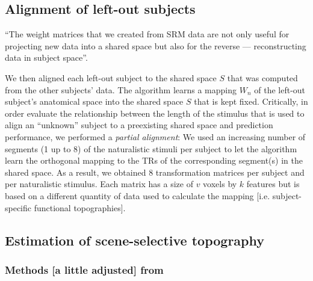 \subsection{Alignment of left-out subjects}


%
%

``The weight matrices that we created from SRM data are not only useful for
projecting new data into a shared space but also for the reverse —
reconstructing data in subject space''.

%
We then aligned each left-out subject to the shared space $S$ that was computed
from the other subjects' data.
%
The algorithm learns a mapping $W_{n}$ of the left-out subject's anatomical
space into the shared space $S$ that is kept fixed.
%
Critically, in order evaluate the relationship between the length of the
stimulus that is used to align an ``unknown'' subject to a preexisting shared
space and prediction performance, we performed a \textit{partial alignment}:
%
We used an increasing number of segments (1 up to 8) of the naturalistic stimuli
per subject to let the algorithm learn the orthogonal mapping to the TRs of the
corresponding segment(s) in the shared space.
%
As a result, we obtained 8 transformation matrices per subject and per
naturalistic stimulus.
%
Each matrix has a size of $v$ voxels by $k$ features but is based on a different
quantity of data used to calculate the mapping [i.e. subject-specific functional
topographies].


\subsection{Estimation of scene-selective topography}


\subsubsection{Methods [a little adjusted] from \citet{jiahui2020predicting}}

